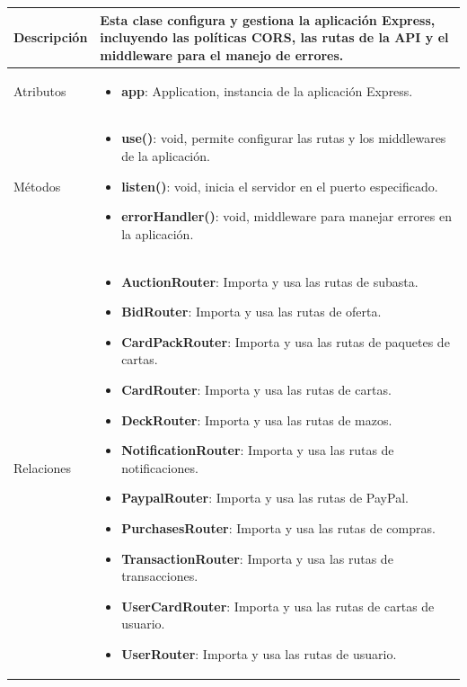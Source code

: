 \begin{longtable}{
    >{\columncolor{lightgreen!20}}p{4cm}
    p{12cm}
    }
    \midrule
    Descripción & Esta clase configura y gestiona la aplicación Express, incluyendo las políticas CORS, las rutas de la API y el middleware para el manejo de errores. \\
    \midrule
    Atributos & \begin{itemize}[nosep,leftmargin=*]
      \item \textbf{app}: Application, instancia de la aplicación Express.
    \end{itemize} \\
    \midrule
    Métodos & \begin{itemize}[nosep,leftmargin=*]
      \item \textbf{use()}: void, permite configurar las rutas y los middlewares de la aplicación.
      \item \textbf{listen()}: void, inicia el servidor en el puerto especificado.
      \item \textbf{errorHandler()}: void, middleware para manejar errores en la aplicación.
    \end{itemize} \\
    \midrule
    Relaciones & \begin{itemize}[nosep,leftmargin=*]
      \item \textbf{AuctionRouter}: Importa y usa las rutas de subasta.
      \item \textbf{BidRouter}: Importa y usa las rutas de oferta.
      \item \textbf{CardPackRouter}: Importa y usa las rutas de paquetes de cartas.
      \item \textbf{CardRouter}: Importa y usa las rutas de cartas.
      \item \textbf{DeckRouter}: Importa y usa las rutas de mazos.
      \item \textbf{NotificationRouter}: Importa y usa las rutas de notificaciones.
      \item \textbf{PaypalRouter}: Importa y usa las rutas de PayPal.
      \item \textbf{PurchasesRouter}: Importa y usa las rutas de compras.
      \item \textbf{TransactionRouter}: Importa y usa las rutas de transacciones.
      \item \textbf{UserCardRouter}: Importa y usa las rutas de cartas de usuario.
      \item \textbf{UserRouter}: Importa y usa las rutas de usuario.
    \end{itemize} \\
    \end{longtable}


